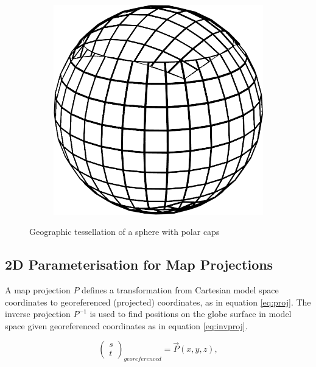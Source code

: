 \begin{figure}
\begin{subfigure}[b]{0.2\textwidth}
    \end{subfigure}
    ~ %
    \begin{subfigure}[b]{0.2\textwidth}
        \includegraphics[width=\textwidth]{figures/tessellation/tessellation_caps_proj3.png}
    \end{subfigure}
    \caption{Geographic tessellation of a sphere with polar caps}
    \label{fig:tessellation_caps}
\end{figure}

\subsection{2D Parameterisation for Map Projections}

A map projection $P$ defines a transformation from Cartesian model space coordinates to georeferenced (projected) coordinates, as in equation \ref{eq:proj}. The inverse projection $P^{-1}$ is used to find positions on the globe surface in model space given georeferenced coordinates as in equation \ref{eq:invproj}.

\begin{equation}
\label{eq:proj}
\begin{pmatrix} s  \\ t  \end{pmatrix}_{ georeferenced }=\vec { P } (x,y,z),
\end{equation}

